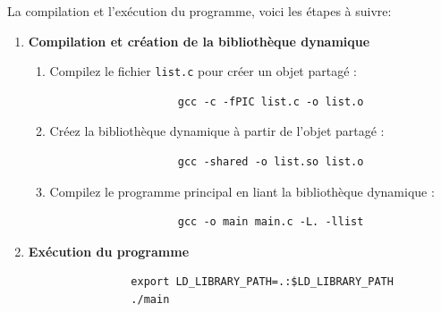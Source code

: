 \documentclass[a4paper,11pt]{article}
\begin{document}
        \noindent
        \noindent La compilation et l'exécution du programme, voici les étapes à suivre:
        \begin{enumerate}
          \item \textbf{Compilation et création de la bibliothèque dynamique}
            \begin{enumerate}
              \item Compilez le fichier \texttt{list.c} pour créer un objet partagé :
                \begin{tcolorbox}[colback=lightgray!6, colframe=black, left=-20mm, right=5mm, top=2mm, bottom=-2mm, boxrule=0.1mm]
                  \begin{verbatim}
                    gcc -c -fPIC list.c -o list.o
                  \end{verbatim}
                \end{tcolorbox}
              \item Créez la bibliothèque dynamique à partir de l'objet partagé :
                \begin{tcolorbox}[colback=lightgray!6, colframe=black, left=-20mm, right=5mm, top=2mm, bottom=-2mm, boxrule=0.1mm]
                  \begin{verbatim}
                    gcc -shared -o list.so list.o
                  \end{verbatim}
                \end{tcolorbox}
              \item Compilez le programme principal en liant la bibliothèque dynamique :
                \begin{tcolorbox}[colback=lightgray!6, colframe=black, left=-20mm, right=5mm, top=2mm, bottom=-2mm, boxrule=0.1mm]
                  \begin{verbatim}
                    gcc -o main main.c -L. -llist
                  \end{verbatim}
                \end{tcolorbox}
            \end{enumerate}
          \item \textbf{Exécution du programme}
            \begin{tcolorbox}[colback=lightgray!6, colframe=black, left=-20mm, right=5mm, top=2mm, bottom=-2mm, boxrule=0.1mm]
              \begin{verbatim}
                export LD_LIBRARY_PATH=.:$LD_LIBRARY_PATH
                ./main
              \end{verbatim}
            \end{tcolorbox}
        \end{enumerate}
\end{document}
